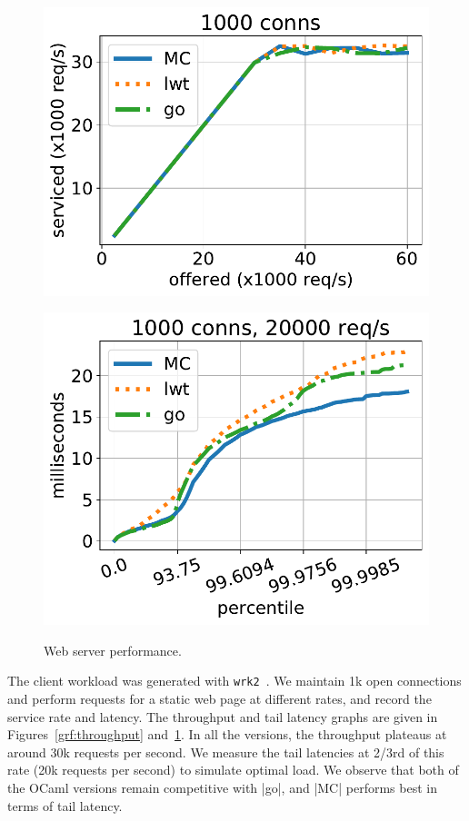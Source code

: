 \documentclass[sigplan,10pt,review,anonymous]{acmart}\settopmatter{printfolios=true,printccs=false,printacmref=false}
\begin{document}
\begin{figure}
	\begin{minipage}{0.49\linewidth}
		\centering
		\includegraphics[width=0.9\linewidth]{http-benchmarks/throughput.pdf}
		\label{grf:throughput}
	\end{minipage}
	\begin{minipage}{0.49\linewidth}
		\includegraphics[width=0.9\linewidth]{http-benchmarks/latency.pdf}
		\label{grf:latency}
	\end{minipage}
	\vspace{-3mm}
	\caption{Web server performance.}
	\vspace{-5mm}
\end{figure}

The client workload was generated with \texttt{wrk2}~\cite{wrk2}. We maintain
1k open connections and perform requests for a static web page at different
rates, and record the service rate and latency. The throughput and tail latency
graphs are given in Figures~\ref{grf:throughput} and~\ref{grf:latency}. In all
the versions, the throughput plateaus at around 30k requests per second. We
measure the tail latencies at 2/3rd of this rate (20k requests per second) to
simulate optimal load. We observe that both of the OCaml versions remain
competitive with |go|, and |MC| performs best in terms of tail latency.
\end{document}
